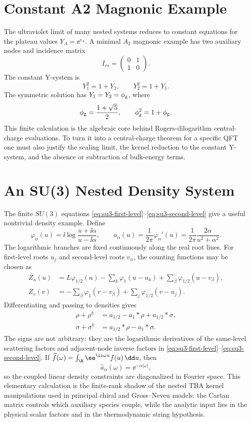 \section{Constant A2 Magnonic Example}

The ultraviolet limit of many nested systems reduces to constant equations
for the plateau values \(Y_A=\ee^{\epsilon_A}\).  A minimal \(A_2\) magnonic
example has two auxiliary nodes and incidence matrix
\[
  I_{rs}=
  \begin{pmatrix}
    0&1\\
    1&0
  \end{pmatrix}.
\]
The constant Y-system is
\[
  Y_1^2=1+Y_2,\qquad
  Y_2^2=1+Y_1 .
\]
The symmetric solution has \(Y_1=Y_2=\phi_{\rm g}\), where
\[
  \phi_{\rm g}=\frac{1+\sqrt5}{2},\qquad
  \phi_{\rm g}^2=1+\phi_{\rm g}.
\]
This finite calculation is the algebraic core behind Rogers-dilogarithm
central-charge evaluations.  To turn it into a central-charge theorem for a
specific QFT one must also justify the scaling limit, the kernel reduction to
the constant Y-system, and the absence or subtraction of bulk-energy terms.

\section{An SU(3) Nested Density System}

The finite \(SU(3)\) equations
\eqref{eq:su3-first-level}--\eqref{eq:su3-second-level} give a useful
nontrivial density example.  Define
\[
  \varphi_\alpha(u)
  =
  \ii\log\frac{u+\ii\alpha}{u-\ii\alpha},
  \qquad
  a_\alpha(u)=\frac{1}{2\pi}\varphi_\alpha'(u)
  =
  \frac{1}{2\pi}\frac{2\alpha}{u^2+\alpha^2}.
\]
The logarithmic branches are fixed continuously along the real root lines.
For first-level roots \(u_j\) and second-level roots \(v_\alpha\), the
counting functions may be chosen as
\[
\begin{aligned}
  Z_u(u)
  &=
  L\varphi_{1/2}(u)
  -\sum_k\varphi_1(u-u_k)
  +\sum_\beta\varphi_{1/2}(u-v_\beta),\\
  Z_v(v)
  &=
  -\sum_\beta\varphi_1(v-v_\beta)
  +\sum_j\varphi_{1/2}(v-u_j).
\end{aligned}
\]
Differentiating and passing to densities gives
\begin{align}
  \rho+\rho^h
  &=
  a_{1/2}-a_1*\rho+a_{1/2}*\sigma ,
  \label{eq:su3-nested-density-first}\\
  \sigma+\sigma^h
  &=
  a_{1/2}*\rho-a_1*\sigma .
  \label{eq:su3-nested-density-second}
\end{align}
The signs are not arbitrary: they are the logarithmic derivatives of the
same-level scattering factors and adjacent-node inverse factors in
\eqref{eq:su3-first-level}--\eqref{eq:su3-second-level}.  If
\(\widehat f(\omega)=\int_\R \ee^{\ii\omega u}f(u)\,\dd u\), then
\[
  \widehat a_\alpha(\omega)=\ee^{-\alpha|\omega|},
\]
so the coupled linear density constraints are diagonalized in Fourier space.
This elementary calculation is the finite-rank shadow of the nested TBA
kernel manipulations used in principal chiral and Gross--Neveu models: the
Cartan matrix controls which auxiliary species couple, while the analytic
input lies in the physical scalar factors and in the thermodynamic string
hypothesis.

